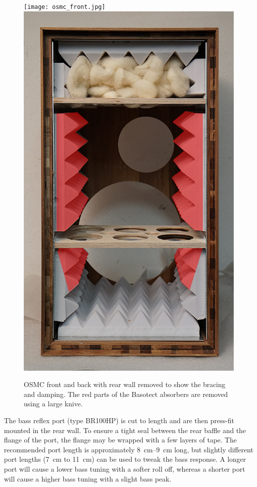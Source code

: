 \documentclass[12pt,a4paper]{article}
\providecommand{\figlabel}[1]{\label{fig:#1}}
\begin{document}
\begin{figure}[tbp]
	\centering
	\texttt{[image: osmc\_front.jpg]}
	\hfill
	\includegraphics[height=0.55\textheight]{osmc_cabinet_open_damping.pdf}
	\caption{OSMC front and back with rear wall removed to show the bracing and damping. The red parts of the Basotect absorbers are removed using a large knive.}
	\figlabel{osmc_photos}
\end{figure}

The bass reflex port (type BR100HP) is cut to length and are then press-fit mounted in the rear wall. To ensure a tight seal between the rear baffle and the flange of the port, the flange may be wrapped with a few layers of tape. The recommended port length is approximately \SIrange{8}{9}{cm} long\cite{osmc_p918}, but slightly different port lengths (\SI{7}{cm} to \SI{11}{cm}) can be used to tweak the bass response. A longer port will cause a lower bass tuning with a softer roll off, whereas a shorter port will cause a higher bass tuning with a slight bass peak.
\end{document}
